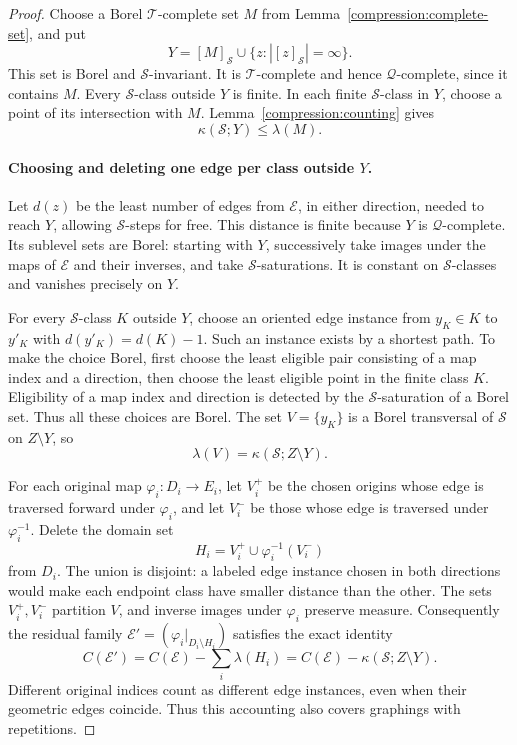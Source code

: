 \begin{proof}
Choose a Borel $\mathcal T$-complete set $M$ from
Lemma~\ref{compression:complete-set}, and put
\[
 Y=[M]_{\mathcal S}
     \cup\{z:|[z]_{\mathcal S}|=\infty\}.
\]
This set is Borel and $\mathcal S$-invariant.  It is
$\mathcal T$-complete and hence $\mathcal Q$-complete, since it contains
$M$.  Every $\mathcal S$-class outside $Y$ is finite.  In each finite
$\mathcal S$-class in $Y$, choose a point of its intersection with $M$.
Lemma~\ref{compression:counting} gives
\begin{equation}\label{compression:retained-classes}
 \kappa(\mathcal S;Y)\leq\lambda(M).
\end{equation}

\paragraph{Choosing and deleting one edge per class outside $Y$.}
Let $d(z)$ be the least number of edges from $\mathcal E$, in either
direction, needed to reach $Y$, allowing $\mathcal S$-steps for free.
This distance is finite because $Y$ is $\mathcal Q$-complete.  Its
sublevel sets are Borel: starting with $Y$, successively take images
under the maps of $\mathcal E$ and their inverses, and take
$\mathcal S$-saturations.  It is constant on $\mathcal S$-classes and
vanishes precisely on $Y$.

For every $\mathcal S$-class $K$ outside $Y$, choose an oriented edge
instance from $y_K\in K$ to $y'_K$ with $d(y'_K)=d(K)-1$.
Such an instance exists by a shortest path.  To make the choice Borel,
first choose the least eligible pair consisting of a map index and a
direction, then choose the least eligible point in the finite class
$K$.  Eligibility of a map index and direction is detected by the
$\mathcal S$-saturation of a Borel set.  Thus all these choices are
Borel.  The set $V=\{y_K\}$ is a Borel transversal of
$\mathcal S$ on $Z\setminus Y$, so
\begin{equation}\label{compression:selector-cost}
 \lambda(V)=\kappa(\mathcal S;Z\setminus Y).
\end{equation}

For each original map $\varphi_i:D_i\to E_i$, let $V_i^+$ be the
chosen origins whose edge is traversed forward under $\varphi_i$, and
let $V_i^-$ be those whose edge is traversed under $\varphi_i^{-1}$.
Delete the domain set
\[
 H_i=V_i^+\cup\varphi_i^{-1}(V_i^-)
\]
from $D_i$.  The union is disjoint: a labeled edge instance chosen in
both directions would make each endpoint class have smaller distance
than the other.  The sets $V_i^+,V_i^-$ partition $V$, and inverse
images under $\varphi_i$ preserve measure.  Consequently the residual
family $\mathcal E'=(\varphi_i|_{D_i\setminus H_i})$ satisfies the
exact identity
\begin{equation}\label{compression:deleted-cost}
 C(\mathcal E')
 =C(\mathcal E)-\sum_i\lambda(H_i)
 =C(\mathcal E)-\kappa(\mathcal S;Z\setminus Y).
\end{equation}
Different original indices count as different edge instances, even
when their geometric edges coincide.  Thus this accounting also covers
graphings with repetitions.


\end{proof}
